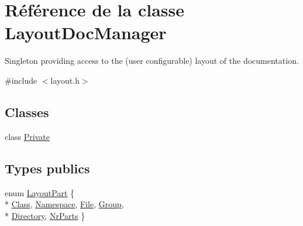 \hypertarget{class_layout_doc_manager}{}\section{Référence de la classe Layout\+Doc\+Manager}
\label{class_layout_doc_manager}


Singleton providing access to the (user configurable) layout of the documentation.  




{\ttfamily \#include $<$layout.\+h$>$}

\subsection*{Classes}
\begin{DoxyCompactItemize}
\item 
class \hyperlink{class_layout_doc_manager_1_1_private}{Private}
\end{DoxyCompactItemize}
\subsection*{Types publics}
\begin{DoxyCompactItemize}
\item 
enum \hyperlink{class_layout_doc_manager_aee13a925ea1f915c542ecd7f579ebc94}{Layout\+Part} \{ \\*
\hyperlink{class_layout_doc_manager_aee13a925ea1f915c542ecd7f579ebc94a797b00e87a4a6eacc27a6452d4d8eb57}{Class}, 
\hyperlink{class_layout_doc_manager_aee13a925ea1f915c542ecd7f579ebc94ad342856294e002e934e11e0b7b1de590}{Namespace}, 
\hyperlink{class_layout_doc_manager_aee13a925ea1f915c542ecd7f579ebc94afda79cb94a5e0b00b5928c2946421043}{File}, 
\hyperlink{class_layout_doc_manager_aee13a925ea1f915c542ecd7f579ebc94a6e34173fdd2293ad484e27cfb5eeffd9}{Group}, 
\\*
\hyperlink{class_layout_doc_manager_aee13a925ea1f915c542ecd7f579ebc94a02b696ad1d3b28cc595a6e9fb537c85f}{Directory}, 
\hyperlink{class_layout_doc_manager_aee13a925ea1f915c542ecd7f579ebc94a5d59ec29416e7a603f2a68ee9e718ed5}{Nr\+Parts}
 \}
\end{DoxyCompactItemize}

